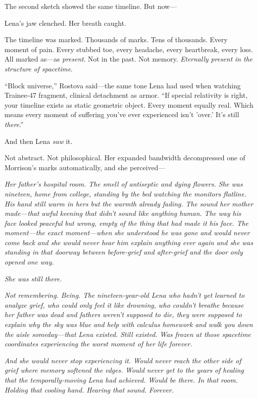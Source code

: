 The second sketch showed the same timeline. But now—

Lena's jaw clenched. Her breath caught.

The timeline was marked. Thousands of marks. Tens of thousands. Every moment of pain. Every stubbed toe, every headache, every heartbreak, every loss. All marked as—as \textit{present}. Not in the past. Not memory. \textit{Eternally present in the structure of spacetime}.

``Block universe,'' Rostova said—the same tone Lena had used when watching Trainee-47 fragment, clinical detachment as armor. ``If special relativity is right, your timeline exists as static geometric object. Every moment equally real. Which means every moment of suffering you've ever experienced isn't 'over.' It's still \textit{there}.''

And then Lena \textit{saw} it.

Not abstract. Not philosophical. Her expanded bandwidth decompressed one of Morrison's marks automatically, and she perceived—

\textit{Her father's hospital room. The smell of antiseptic and dying flowers. She was nineteen, home from college, standing by the bed watching the monitors flatline. His hand still warm in hers but the warmth already fading. The sound her mother made—that awful keening that didn't sound like anything human. The way his face looked peaceful but wrong, empty of the thing that had made it his face. The moment—the exact moment—when she understood he was gone and would never come back and she would never hear him explain anything ever again and she was standing in that doorway between before-grief and after-grief and the door only opened one way.}

\textit{She was still there.}

\textit{Not remembering. Being. The nineteen-year-old Lena who hadn't yet learned to analyze grief, who could only feel it like drowning, who couldn't breathe because her father was dead and fathers weren't supposed to die, they were supposed to explain why the sky was blue and help with calculus homework and walk you down the aisle someday—that Lena existed. Still existed. Was frozen at those spacetime coordinates experiencing the worst moment of her life forever.}

\textit{And she would never stop experiencing it. Would never reach the other side of grief where memory softened the edges. Would never get to the years of healing that the temporally-moving Lena had achieved. Would be there. In that room. Holding that cooling hand. Hearing that sound. Forever.}

